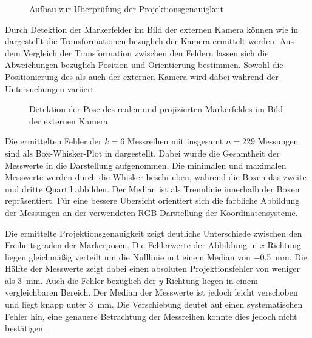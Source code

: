 \begin{figure}[!ht]
	\begin{center}%
		\caption{Aufbau zur Überprüfung der Projektionsgenauigkeit}
		\label{fig.projsetup}
	\end{center}
\end{figure}

Durch Detektion der Markerfelder im Bild der externen Kamera können wie in  dargestellt die Transformationen bezüglich der Kamera ermittelt werden. Aus dem Vergleich der Transformation zwischen den Feldern lassen sich die Abweichungen bezüglich Position und Orientierung bestimmen. Sowohl die Positionierung des  als auch der externen Kamera wird dabei während der Untersuchungen variiert.\\

\prever{
}

\begin{figure}[!ht]
	\begin{center}
		\caption{Detektion der Pose des realen und projizierten Markerfeldes im Bild der externen Kamera}
		\label{fig.arprojected}
	\end{center}
\end{figure}%

Die ermittelten Fehler der $k=6$ Messreihen mit insgesamt $n=229$ Messungen sind als Box-Whisker-Plot in  dargestellt. Dabei wurde die Gesamtheit der Messwerte in die Darstellung aufgenommen. Die minimalen und maximalen Messwerte werden durch die Whisker beschrieben, während die Boxen das zweite und dritte Quartil abbilden. Der Median ist als Trennlinie innerhalb der Boxen repräsentiert. Für eine bessere Übersicht orientiert sich die farbliche Abbildung der Messungen an der verwendeten RGB-Darstellung der Koordinatensysteme.

\prever{
}

%

Die ermittelte Projektionsgenauigkeit zeigt deutliche Unterschiede zwischen den Freiheitsgraden der Markerposen. Die Fehlerwerte der Abbildung in $x$-Richtung liegen gleichmäßig verteilt um die Nulllinie mit einem Median von \SI{-0.5}{\milli\meter}. Die Hälfte der Messwerte zeigt dabei einen absoluten Projektionsfehler von weniger als \SI{3}{\milli\meter}. Auch die Fehler bezüglich der $y$-Richtung liegen in einem vergleichbaren Bereich. Der Median der Messwerte ist jedoch leicht verschoben und liegt knapp unter \SI{3}{\milli\meter}. Die Verschiebung deutet auf einen systematischen Fehler hin, eine genauere Betrachtung der Messreihen konnte dies jedoch nicht bestätigen.\\

